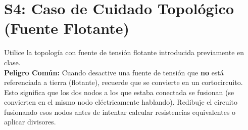 \documentclass[11pt, a4paper]{article}
\begin{document}
\section*{S4: Caso de Cuidado Topológico (Fuente Flotante)}
Utilice la topología con fuente de tensión flotante introducida previamente en clase.
\\
\textbf{Peligro Común:} Cuando desactive una fuente de tensión que \textbf{no} está referenciada a tierra (flotante), recuerde que se convierte en un cortocircuito. Esto significa que los dos nodos a los que estaba conectada se fusionan (se convierten en el mismo nodo eléctricamente hablando). Redibuje el circuito fusionando esos nodos antes de intentar calcular resistencias equivalentes o aplicar divisores. 
\end{document}
